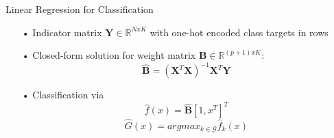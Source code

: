 \documentclass{beamer}
\begin{document}
\begin{frame}{Linear Regression for Classification}
\begin{itemize}

\item[•] Indicator matrix $\mathbf{Y} \in \mathbb{R}^{NxK}$ with one-hot encoded class targets in rows

\vspace{0.2cm}
\item[•] Closed-form solution for weight matrix $\mathbf{B} \in \mathbb{R}^{(p+1)xK}$:
\begin{equation*}
\hat{\mathbf{B}} = (\mathbf{X}^T\mathbf{X})^{-1}\mathbf{X}^T\mathbf{Y}
\end{equation*}

\vspace{0.2cm}
\item[•] Classification via 
\begin{equation*}
\hat{f}(x)=\hat{\mathbf{B}}[1,x^T]^T
\end{equation*}
\begin{equation*}
\hat{G}(x) = argmax_{k \in \mathcal{G}} \hat{f}_k(x)
\end{equation*}

\end{itemize}
\end{frame}
\end{document}
